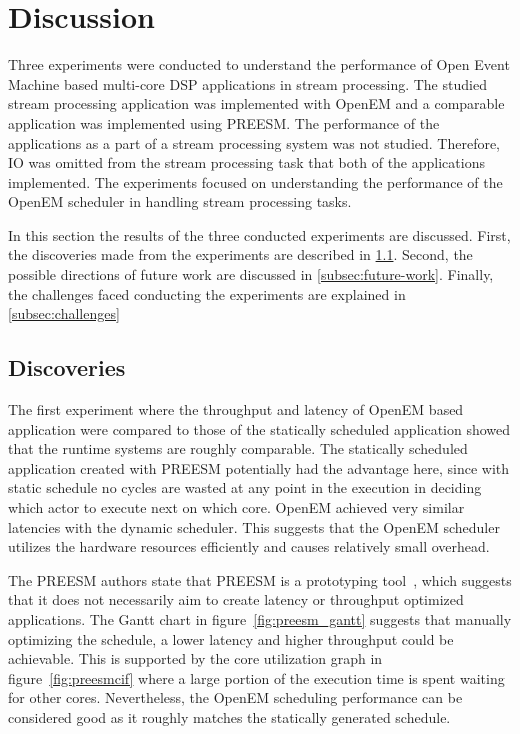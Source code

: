 \section{Discussion}
\label{sec:discussion}
Three experiments were conducted to understand the performance of Open Event Machine based multi-core DSP applications in stream processing. The studied stream processing application was implemented with OpenEM and a comparable application was implemented using PREESM. The performance of the applications as a part of a stream processing system was not studied. Therefore, IO was omitted from the stream processing task that both of the applications implemented. The experiments focused on understanding the performance of the OpenEM scheduler in handling stream processing tasks.

In this section the results of the three conducted experiments are discussed. First, the discoveries made from the experiments are described in \ref{subsec:discoveries}. Second, the possible directions of future work are discussed in \ref{subsec:future-work}. Finally, the challenges faced conducting the experiments are explained in \ref{subsec:challenges}

\subsection{Discoveries}
\label{subsec:discoveries}
\FloatBarrier
The first experiment where the throughput and latency of OpenEM based application were compared to those of the statically scheduled application showed that the runtime systems are roughly comparable. The statically scheduled application created with PREESM potentially had the advantage here, since with static schedule no cycles are wasted at any point in the execution in deciding which actor to execute next on which core. OpenEM achieved very similar latencies with the dynamic scheduler. This suggests that the OpenEM scheduler utilizes the hardware resources efficiently and causes relatively small overhead.

The PREESM authors state that PREESM is a prototyping tool~\cite{preesm}, which suggests that it does not necessarily aim to create latency or throughput optimized applications. The Gantt chart in figure~\ref{fig:preesm_gantt} suggests that manually optimizing the schedule, a lower latency and higher throughput could be achievable. This is supported by the core utilization graph in figure~\ref{fig:preesmcif} where a large portion of the execution time is spent waiting for other cores. Nevertheless, the OpenEM scheduling performance can be considered good as it roughly matches the statically generated schedule.

